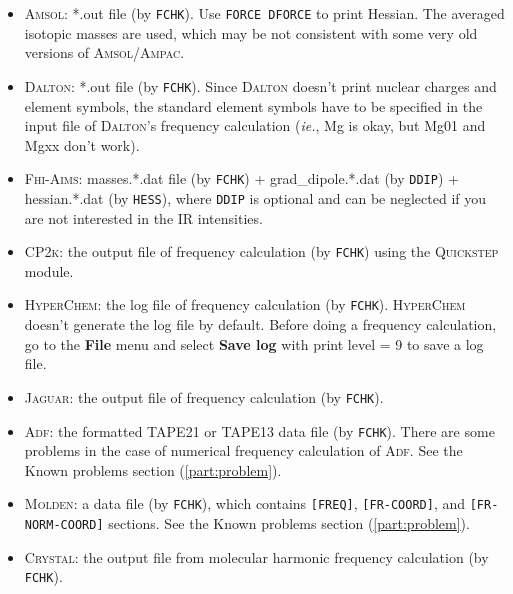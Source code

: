 \documentclass[12pt,english]{extarticle}
\begin{document}
\begin{itemize}
\item \textsc{Amsol}: *.out file (by \verb|FCHK|). Use \texttt{FORCE DFORCE} to print
Hessian. The averaged isotopic masses are used, which may be not
consistent with some very old versions of \textsc{Amsol/Ampac}.
\item \textsc{Dalton}: *.out file (by \verb|FCHK|). Since \textsc{Dalton} doesn't print nuclear
charges and element symbols, the standard element symbols have to be
specified in the input file of \textsc{Dalton}'s frequency calculation (\emph{ie.}, Mg is
okay, but Mg01 and Mgxx don't work).
\item \textsc{Fhi-Aims}: masses.*.dat file (by \verb|FCHK|) + grad{\_}dipole.*.dat (by
\verb|DDIP|) + hessian.*.dat (by \verb|HESS|), where \verb|DDIP| is
optional and can be neglected if you are not interested in the IR
intensities.
\item \textsc{CP2k}: the output file of frequency calculation (by \verb|FCHK|) using the
\textsc{Quickstep} module.
\item \textsc{HyperChem}: the log file of frequency calculation (by \verb|FCHK|).
\textsc{HyperChem} doesn't generate the log file by default. Before doing a frequency
calculation, go to the \textbf{File} menu and select \textbf{Save log} with print level = 9 to save a
log file.
\item \textsc{Jaguar}: the output file of frequency calculation (by \verb|FCHK|).
\item \textsc{Adf}: the formatted TAPE21 or TAPE13 data file (by \verb|FCHK|). There are
some problems in the case of numerical frequency calculation of \textsc{Adf}. See the
Known problems section (\ref{part:problem}).
\item \textsc{Molden}: a data file (by \verb|FCHK|), which contains \verb|[FREQ]|,
\verb|[FR-COORD]|, and \verb|[FR-NORM-COORD]| sections.
See the Known problems section (\ref{part:problem}).
\item \textsc{Crystal}: the output file from molecular harmonic frequency calculation (by \verb|FCHK|).

\end{itemize}
\end{document}
